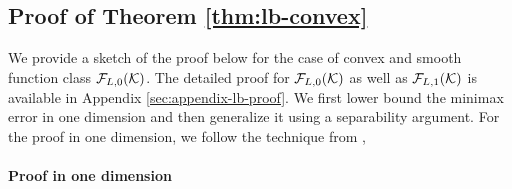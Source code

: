 \subsection{Proof of Theorem  \ref{thm:lb-convex}}
\label{sec:lb-proof}
We provide a sketch of the proof below for the case of convex and smooth function class $\mathcal{F}_{L,0}(\mathcal{K})$. The detailed proof for $\mathcal{F}_{L,0}(\mathcal{K})$ as well as $\mathcal{F}_{L,1}(\mathcal{K})$ is available in Appendix \ref{sec:appendix-lb-proof}.
We first lower bound  the minimax error in one dimension and then generalize it using a separability argument. For the proof in one dimension, we follow the technique from \cite{shamir2012complexity,duchi2015optimal},  

\paragraph{Proof in one dimension}


